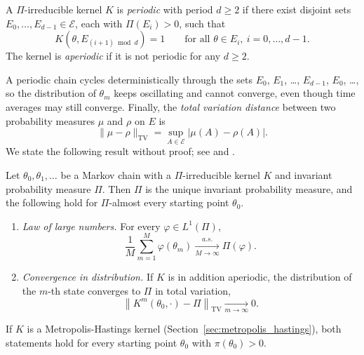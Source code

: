 \begin{definition}
    \label{def:aperiodicity}
    A $\Pi$-irreducible kernel $K$ is \emph{periodic} with period $d\ge2$ if there exist disjoint sets $E_0,\ldots,E_{d-1}\in\mathcal{E}$, each with $\Pi(E_i)>0$, such that
    \begin{equation}
        K\left(\theta,E_{(i+1)\bmod d}\right) = 1 \qquad\text{for all }\theta\in E_i,\ i=0,\ldots,d-1.
    \end{equation}
    The kernel is \emph{aperiodic} if it is not periodic for any $d\ge2$.
\end{definition}
A periodic chain cycles deterministically through the sets $E_0$, $E_1$, \ldots, $E_{d-1}$, $E_0$, \ldots, so the distribution of $\theta_m$ keeps oscillating and cannot converge, even though time averages may still converge. Finally, the \emph{total variation distance} between two probability measures $\mu$ and $\rho$ on $E$ is
\begin{equation}
    \|\mu-\rho\|_{\mathrm{TV}} = \sup_{A\in\mathcal{E}}\left|\mu(A)-\rho(A)\right|.
\end{equation}
We state the following result without proof; see \cite[Theorems~1 and~3, Corollary~2]{tierney1994markov} and \cite[Chapter~6]{robert2004monte}.

\begin{theorem}
    \label{thm:ergodic_theorem}
    Let $\theta_0,\theta_1,\ldots$ be a Markov chain with a $\Pi$-irreducible kernel $K$ and invariant probability measure $\Pi$. Then $\Pi$ is the unique invariant probability measure, and the following hold for $\Pi$-almost every starting point $\theta_0$.
    \begin{enumerate}
        \item \emph{Law of large numbers.} For every $\varphi\in L^1(\Pi)$,
        \begin{equation}
            \frac{1}{M}\sum_{m=1}^{M}\varphi(\theta_m)\xrightarrow[M\to\infty]{a.s.}\Pi(\varphi).
        \end{equation}
        \item \emph{Convergence in distribution.} If $K$ is in addition aperiodic, the distribution of the $m$-th state converges to $\Pi$ in total variation,
        \begin{equation}
            \left\|K^m(\theta_0,\cdot)-\Pi\right\|_{\mathrm{TV}}\xrightarrow[m\to\infty]{}0.
        \end{equation}
    \end{enumerate}
    If $K$ is a Metropolis-Hastings kernel (Section~\ref{sec:metropolis_hastings}), both statements hold for every starting point $\theta_0$ with $\pi(\theta_0)>0$.
\end{theorem}

